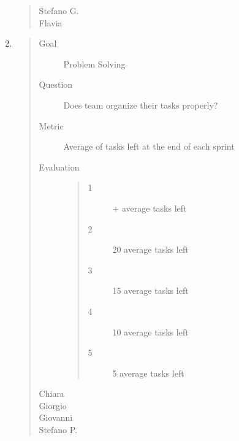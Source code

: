 \documentclass[letterpaper,10pt,italian]{sphinxmanual}
\begin{document}
\begin{enumerate}
\begin{quote}
\begin{description}
\item[{Stefano G.}] \leavevmode
{}

\item[{Flavia}] \leavevmode
{}

\end{description}\end{quote}

\item {} \begin{quote}\begin{description}
\item[{Goal}] \leavevmode
\sphinxAtStartPar
Problem Solving

\item[{Question}] \leavevmode
\sphinxAtStartPar
Does team organize their tasks properly?

\item[{Metric}] \leavevmode
\sphinxAtStartPar
Average of tasks left at the end of each sprint

\item[{Evaluation}] \leavevmode\begin{quote}\begin{description}
\item[{1}] \leavevmode
{}+ average tasks left

\item[{2}] \leavevmode
{}\sphinxhyphen{}20 average tasks left

\item[{3}] \leavevmode
{}\sphinxhyphen{}15 average tasks left

\item[{4}] \leavevmode
{}\sphinxhyphen{}10 average tasks left

\item[{5}] \leavevmode
{}\sphinxhyphen{}5 average tasks left

\end{description}\end{quote}

\item[{Chiara}] \leavevmode
{}

\item[{Giorgio}] \leavevmode
{}

\item[{Giovanni}] \leavevmode
{}

\item[{Stefano P.}] \leavevmode
{}


\end{description}
\end{quote}
\end{enumerate}
\end{document}
